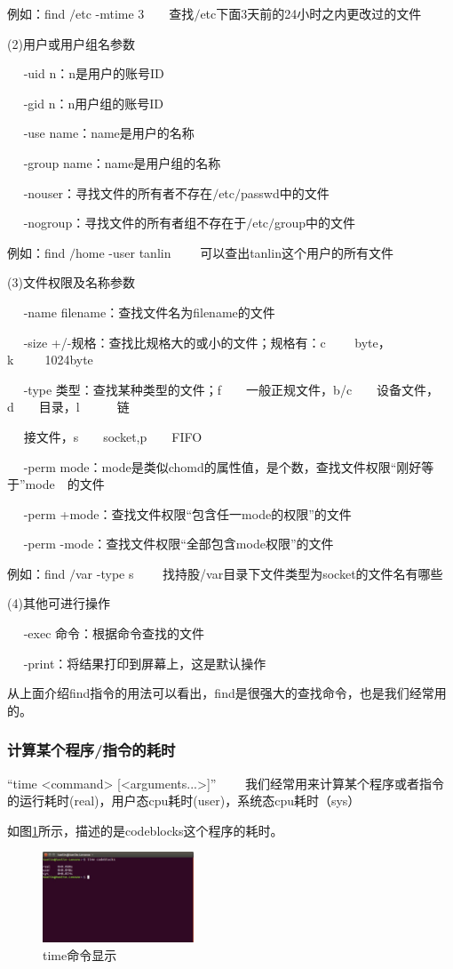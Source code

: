 \documentclass{article}
\begin{document}
例如：find $\slash$etc -mtime 3~~~~查找$\slash$etc下面3天前的24小时之内更改过的文件

(2)用户或用户组名参数

~~ -uid n：n是用户的账号ID

~~ -gid n：n用户组的账号ID

~~ -use name：name是用户的名称

~~ -group name：name是用户组的名称

~~ -nouser：寻找文件的所有者不存在$\slash$etc$\slash$passwd中的文件

~~ -nogroup：寻找文件的所有者组不存在于$\slash$etc$\slash$group中的文件

例如：find $\slash$home -user tanlin ~~~~可以查出tanlin这个用户的所有文件

(3)文件权限及名称参数

~~ -name filename：查找文件名为filename的文件

~~ -size +/-规格：查找比规格大的或小的文件；规格有：c ~~~~byte，k~~~~~1024byte

~~ -type 类型：查找某种类型的文件；f~~~~一般正规文件，b/c~~~~设备文件，d~~~~目录，l~~~~~~链

~~ 接文件，s~~~~socket,p~~~~FIFO

~~ -perm mode：mode是类似chomd的属性值，是个数，查找文件权限“刚好等于”mode~~的文件

~~ -perm +mode：查找文件权限“包含任一mode的权限”的文件

~~ -perm -mode：查找文件权限“全部包含mode权限”的文件

例如：find $\slash$var -type s  ~~~~找持股/var目录下文件类型为socket的文件名有哪些

(4)其他可进行操作

~~ -exec 命令：根据命令查找的文件

~~ -print：将结果打印到屏幕上，这是默认操作

从上面介绍find指令的用法可以看出，find是很强大的查找命令，也是我们经常用的。
\subsubsection{计算某个程序/指令的耗时}
“time <command> [<arguments...>]” ~~~~我们经常用来计算某个程序或者指令的运行耗时(real)，用户态cpu耗时(user)，系统态cpu耗时（sys）

如图\ref{tu35}所示，描述的是codeblocks这个程序的耗时。
\begin{figure}[!htb] %
\centering
\includegraphics[width=0.4\textwidth]{tu35.jpeg}
\caption{\small time命令显示}
\label{tu35}
\end{figure} 
\end{document}
